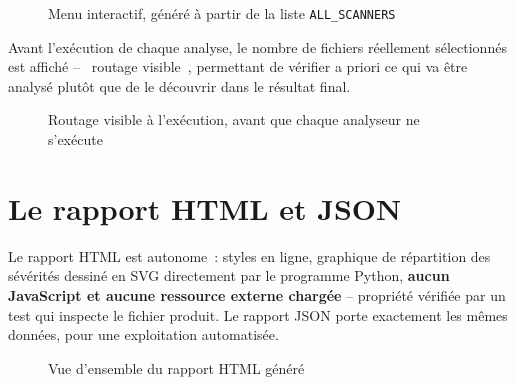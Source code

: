 \documentclass[12pt,a4paper,oneside]{report}
\begin{document}
\begin{figure}[H]
\centering
{}
\caption{Menu interactif, g\'en\'er\'e \`a partir de la liste \texttt{ALL\_SCANNERS}}
\label{fig:menu}
\end{figure}

Avant l'ex\'ecution de chaque analyse, le nombre de fichiers r\'eellement s\'electionn\'es est affich\'e -- \guillemotleft~routage visible~\guillemotright, permettant de v\'erifier a priori ce qui va \^etre analys\'e plut\^ot que de le d\'ecouvrir dans le r\'esultat final.

\begin{figure}[H]
\centering
{}
\caption{Routage visible \`a l'ex\'ecution, avant que chaque analyseur ne s'ex\'ecute}
\label{fig:routage-terminal}
\end{figure}

\section{Le rapport HTML et JSON}
Le rapport HTML est autonome~: styles en ligne, graphique de r\'epartition des s\'ev\'erit\'es dessin\'e en SVG directement par le programme Python, \textbf{aucun JavaScript et aucune ressource externe charg\'ee} -- propri\'et\'e v\'erifi\'ee par un test qui inspecte le fichier produit. Le rapport JSON porte exactement les m\^emes donn\'ees, pour une exploitation automatis\'ee.

\begin{figure}[H]
\centering
{}
\caption{Vue d'ensemble du rapport HTML g\'en\'er\'e}
\label{fig:rapport-vue}
\end{figure}
\end{document}
